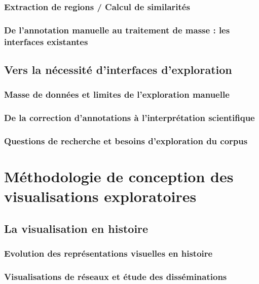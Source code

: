 \documentclass[a4paper,12pt,twoside]{book}
\newcommand{\clearemptydoublepage}{\newpage{\pagestyle{empty}\cleardoublepage}}
\begin{document}
	\section{Extraction de regions / Calcul de similarités}
	
	
	\section{De l'annotation manuelle au traitement de masse : les interfaces existantes}
	
	
	\clearemptydoublepage
	
	\chapter{Vers la nécessité d'interfaces d'exploration}
	\section{Masse de données et limites de l'exploration manuelle}
	
	
	\section{De la correction d'annotations à l'interprétation scientifique}
	
	
	\section{Questions de recherche et besoins d'exploration du corpus}
	
	
	\clearemptydoublepage
	
	
	\part{Méthodologie de conception des visualisations exploratoires}
	\chapter{La visualisation en histoire}
	\section{Evolution des représentations visuelles en histoire}
	
	
	\section{Visualisations de réseaux et étude des disséminations}
	
	
\end{document}
